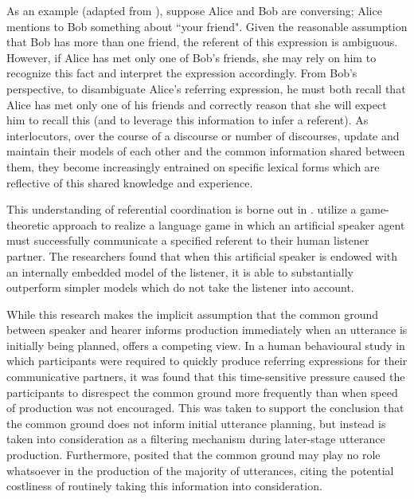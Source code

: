 \documentclass[12pt,a4paper]{article}
\begin{document}
As an example (adapted from \citeauthor{clark1982}), suppose Alice and Bob are conversing; Alice mentions to Bob something about ``your friend". Given the reasonable assumption that Bob has more than one friend, the referent of this expression is ambiguous. However, if Alice has met only one of Bob's friends, she may rely on him to recognize this fact and interpret the expression accordingly. From Bob's perspective, to disambiguate Alice's referring expression, he must both recall that Alice has met only one of his friends and  correctly reason that she will expect him to recall this (and to leverage this information to infer a referent). As interlocutors, over the course of a discourse or number of discourses, update and maintain their models of each other and the common information shared between them, they become increasingly entrained on specific lexical forms which are reflective of this shared knowledge and experience.

This understanding of referential coordination is borne out in \cite{golland2010}. \citeauthor{golland2010} utilize a game-theoretic approach to realize a language game in which an artificial speaker agent must successfully communicate a specified referent to their human listener partner. The researchers found that when this artificial speaker is endowed with an internally embedded model of the listener, it is able to substantially outperform simpler models which do not take the listener into account.

While this research makes the implicit assumption that the common ground between speaker and hearer informs production immediately when an utterance is initially being planned, \cite{horton1996} offers a competing view. In a human behavioural study in which participants were required to quickly produce referring expressions for their communicative partners, it was found that this time-sensitive pressure caused the participants to disrespect the common ground more frequently than when speed of production was not encouraged. This was taken to support the conclusion that the common ground does not inform initial utterance planning, but instead is taken into consideration as a filtering mechanism during later-stage utterance production. Furthermore, \citeauthor{horton1996} posited that the common ground may play no role whatsoever in the production of the majority of utterances, citing the potential costliness of routinely taking this information into consideration.
\end{document}
